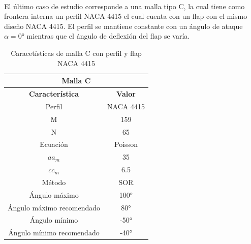 \documentclass[letterpaper, openright, 12pt]{book}
\begin{document}
   \paragraph*{}
   El último caso de estudio corresponde a una malla tipo C, la cual tiene como
   frontera interna un perfil NACA 4415 el cual cuenta con un flap con el mismo
   diseño NACA 4415. El perfil se mantiene constante con un ángulo de ataque
   $\alpha = 0\si{\degree}$ mientras que el ángulo de deflexión del flap se
   varía.

    \begin{table}[htbp!]
    \begin{center}
        \begin{tabular}{| c | c |}
        \hline
        \multicolumn{2}{|c|}{Malla C}\\

        \hline
        \textbf{Característica} & \textbf{Valor} \\ \hline

        Perfil & NACA 4415
        \\ \hline

        M & 159
        \\ \hline

        N & 65
        \\ \hline

        Ecuación & Poisson
        \\\hline

        $aa_m$ & 35
        \\ \hline

        $cc_m$ & 6.5
        \\ \hline

        Método & SOR
        \\\hline

        Ángulo máximo & 100\si{\degree}
        \\ \hline

        Ángulo máximo recomendado & 80\si{\degree}
        \\ \hline

        Ángulo mínimo & -50\si{\degree}
        \\ \hline

        Ángulo mínimo recomendado & -40\si{\degree}
        \\ \hline
        \end{tabular}
        \caption{Caracetísticas de malla C con perfil y flap NACA 4415}
    \label{tabla_c_naca_4415}
    \end{center}
    \end{table}
\end{document}
